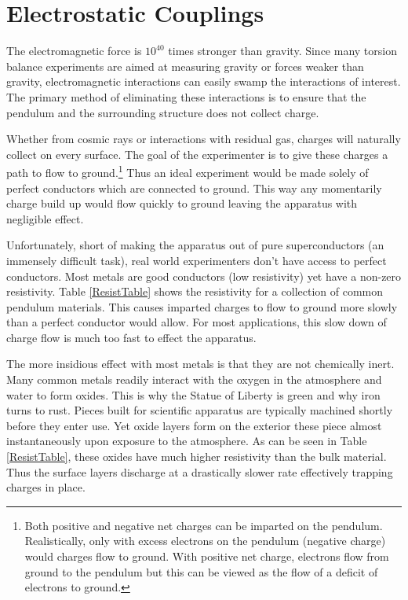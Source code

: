 \documentclass{book}
\begin{document}
\section{Electrostatic Couplings}\label{elect}

\quad The electromagnetic force is $10^{40}$ times stronger than gravity. Since many torsion balance experiments are aimed at measuring gravity or forces weaker than gravity, electromagnetic interactions can easily swamp the interactions of interest. The primary method of eliminating these interactions is to ensure that the pendulum and the surrounding structure does not collect charge. 

Whether from cosmic rays or interactions with residual gas, charges will naturally collect on every surface. The goal of the experimenter is to give these charges a path to flow to ground.\footnote{Both positive and negative net charges can be imparted on the pendulum. Realistically, only with excess electrons on the pendulum (negative charge) would charges flow to ground. With positive net charge, electrons flow from ground to the pendulum but this can be viewed as the flow of a deficit of electrons to ground.} Thus an ideal experiment would be made solely of perfect conductors which are connected to ground. This way any momentarily charge build up would flow quickly to ground leaving the apparatus with negligible effect.

Unfortunately, short of making the apparatus out of pure superconductors (an immensely difficult task), real world experimenters don't have access to perfect conductors. Most metals are good conductors (low resistivity) yet have a non-zero resistivity. Table \ref{ResistTable} shows the resistivity for a collection of common pendulum materials. This causes imparted charges to flow to ground more slowly than a perfect conductor would allow. For most applications, this slow down of charge flow is much too fast to effect the apparatus. 

The more insidious effect with most metals is that they are not chemically inert. Many common metals readily interact with the oxygen in the atmosphere and water to form oxides. This is why the Statue of Liberty is green and why iron turns to rust. Pieces built for scientific apparatus are typically machined shortly before they enter use. Yet oxide layers form on the exterior these piece almost instantaneously upon exposure to the atmosphere. As can be seen in Table \ref{ResistTable}, these oxides have much higher resistivity than the bulk material. Thus the surface layers discharge at a drastically slower rate effectively trapping charges in place.
\end{document}
